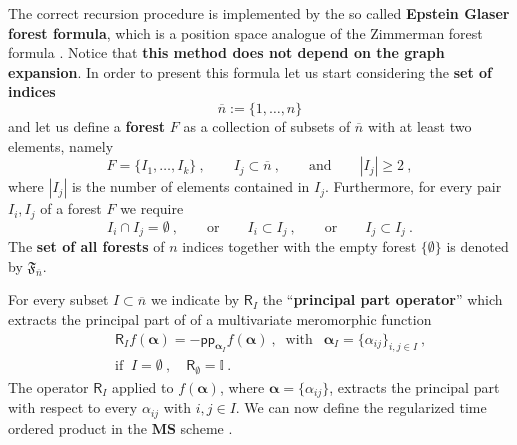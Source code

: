 \documentclass[11pt]{book}
\newcommand{\pp}{\mathsf{pp}}
\newcommand{\MS}{\textbf{MS}}
\newcommand{\alphabd}{\boldsymbol{\alpha}}
\newcommand{\abs}[1]{\left|#1\right|}
\newcommand{\Ibb}{\mathbb{I}}
\newcommand{\Rsf}{\mathsf{R}}
\theoremstyle{break}
\begin{document}
The correct recursion procedure is implemented by the so called \textbf{Epstein Glaser forest formula}, which is a position space analogue of the Zimmerman forest formula \cite{DFKR_2014}. Notice that \textbf{this method does not depend on the graph expansion}. In order to present this formula let us start considering the \textbf{set of indices}
%
\begin{equation*}
\overline{n} := \{1,\dots , n\}
\end{equation*}
%
and let us define a \textbf{forest} $F$ as a collection of subsets of $\overline{n}$ with at least two elements, namely 
%
\begin{equation*}
F = \{ I_1,\dots, I_k\} \ , \qquad I_j \subset \overline{n} \ , \qquad \mbox{and} \qquad \abs{I_j} \geq 2 \ ,
\end{equation*}
%
where $\abs{I_j}$ is the number of elements contained in $I_j$. Furthermore, for every pair $I_i,I_j$ of a forest $F$ we require
%
\begin{equation*}
I_i\cap I_j = \emptyset \ , \qquad \text{or} \qquad I_i \subset I_j \ , \qquad \mbox{or} \qquad  I_j\subset I_j \ .
\end{equation*}
%
The \textbf{set of all forests} of $n$ indices together with the empty forest $\{\emptyset\}$ is denoted by $\mathfrak{F}_{\overline{n}}$.


For every subset $I\subset \overline{n}$ we indicate by $\Rsf_I$\index{$\Rsf_I $} the ``\textbf{principal part operator}'' which extracts the principal part of of a multivariate meromorphic function
%
\begin{eqnarray}
&& \Rsf_I f(\alphabd) = - \pp_{\alphabd_I} f(\alphabd) \ , \ \mbox{ with } \ \ \alphabd_I = \{\alpha_{ij}\}_{i,j \in I} \ , \\
\label{eq:pp_op}
&& \mbox{if } \ I=\emptyset \ , \quad \Rsf_\emptyset = \Ibb \ . \nonumber
\end{eqnarray}
%
The operator $\Rsf_I$ applied to $f(\alphabd)$, where $\alphabd = \{\alpha_{ij}\}$, extracts the principal part with respect to every $\alpha_{ij}$ with $i,j\in I$. We can now define the regularized time ordered product in the $\MS$ scheme \cite{DFKR_2014}.
\end{document}
